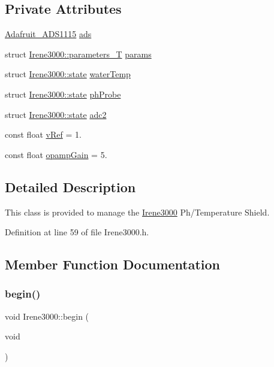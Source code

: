 \subsection*{Private Attributes}
\begin{DoxyCompactItemize}
\item 
\hyperlink{class_adafruit___a_d_s1115}{Adafruit\+\_\+\+A\+D\+S1115} \hyperlink{class_irene3000_a1215e77ba761c9908d80d691f149e135}{ads}
\item 
struct \hyperlink{struct_irene3000_1_1parameters___t}{Irene3000\+::parameters\+\_\+T} \hyperlink{class_irene3000_a136585a5ee7f9ac6ab52175fa153f8e3}{params}
\item 
struct \hyperlink{struct_irene3000_1_1state}{Irene3000\+::state} \hyperlink{class_irene3000_af05612c78c758ce9db316c75ad937130}{water\+Temp}
\item 
struct \hyperlink{struct_irene3000_1_1state}{Irene3000\+::state} \hyperlink{class_irene3000_a997a4ee466fa1d5416e07e444965dc9e}{ph\+Probe}
\item 
struct \hyperlink{struct_irene3000_1_1state}{Irene3000\+::state} \hyperlink{class_irene3000_aae3a95a1c83c766cd2f299ce471c337e}{adc2}
\item 
const float \hyperlink{class_irene3000_a018e7ff9bee57e6d2b298667a668ba7e}{v\+Ref} = 1.
\item 
const float \hyperlink{class_irene3000_a4e588985ca74e5076029d5dee81034f2}{opamp\+Gain} = 5.
\end{DoxyCompactItemize}


\subsection{Detailed Description}
This class is provided to manage the \hyperlink{class_irene3000}{Irene3000} Ph/\+Temperature Shield. 

Definition at line 59 of file Irene3000.\+h.



\subsection{Member Function Documentation}
\mbox{\label{class_irene3000_ad5891806c500ae1007afe52b9e304c2b}} 
\subsubsection{\texorpdfstring{begin()}{begin()}}
{\footnotesize\ttfamily void Irene3000\+::begin (\begin{DoxyParamCaption}\item[{void}]{ }\end{DoxyParamCaption})}


